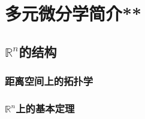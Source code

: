 \chapter{多元微分学简介**}
\section{\texorpdfstring{$\mathbb{R}^n$}n的结构}
\subsection{距离空间上的拓扑学}
\clearpage
\subsection{\texorpdfstring{$\mathbb{R}^n$}n上的基本定理}

\clearpage
